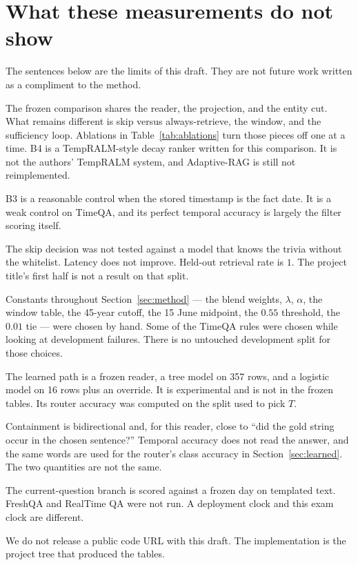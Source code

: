 \documentclass[11pt]{article}
\begin{document}
\section{What these measurements do not show}
\label{sec:limits}

The sentences below are the limits of this draft.
They are not future work written as a compliment to the method.

The frozen comparison shares the reader, the projection, and the entity cut.
What remains different is skip versus always-retrieve, the window, and the sufficiency loop.
Ablations in Table~\ref{tab:ablations} turn those pieces off one at a time.
B4 is a TempRALM-style decay ranker written for this comparison.
It is not the authors' TempRALM system, and Adaptive-RAG is still not reimplemented.

B3 is a reasonable control when the stored timestamp is the fact date.
It is a weak control on TimeQA, and its perfect temporal accuracy is largely the filter scoring itself.

The skip decision was not tested against a model that knows the trivia without the whitelist.
Latency does not improve.
Held-out retrieval rate is $1$.
The project title's first half is not a result on that split.

Constants throughout Section~\ref{sec:method} --- the blend weights, $\lambda$, $\alpha$, the window table, the 45-year cutoff, the 15 June midpoint, the $0.55$ threshold, the $0.01$ tie --- were chosen by hand.
Some of the TimeQA rules were chosen while looking at development failures.
There is no untouched development split for those choices.

The learned path is a frozen reader, a tree model on 357 rows, and a logistic model on 16 rows plus an override.
It is experimental and is not in the frozen tables.
Its router accuracy was computed on the split used to pick $T$.

Containment is bidirectional and, for this reader, close to ``did the gold string occur in the chosen sentence?''
Temporal accuracy does not read the answer, and the same words are used for the router's class accuracy in Section~\ref{sec:learned}.
The two quantities are not the same.

The current-question branch is scored against a frozen day on templated text.
FreshQA and RealTime QA were not run.
A deployment clock and this exam clock are different.

We do not release a public code URL with this draft.
The implementation is the project tree that produced the tables.
\end{document}
